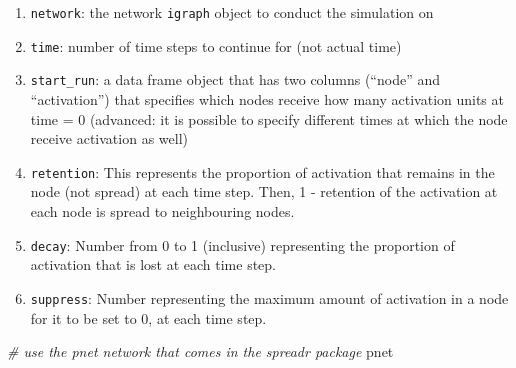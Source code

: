\documentclass[
]{book}
\newenvironment{Shaded}{\begin{snugshade}}{\end{snugshade}}
\newcommand{\CommentTok}[1]{\textcolor[rgb]{0.56,0.35,0.01}{\textit{#1}}}
\newcommand{\NormalTok}[1]{#1}
\providecommand{\tightlist}{%
  \setlength{\itemsep}{0pt}\setlength{\parskip}{0pt}}
\begin{document}
\begin{enumerate}
\def\labelenumi{\arabic{enumi}.}
\tightlist
\item
  \texttt{network}: the network \texttt{igraph} object to conduct the simulation on
\item
  \texttt{time}: number of time steps to continue for (not actual time)
\item
  \texttt{start\_run}: a data frame object that has two columns (``node'' and ``activation'') that specifies which nodes receive how many activation units at time = 0 (advanced: it is possible to specify different times at which the node receive activation as well)
\item
  \texttt{retention}: This represents the proportion of activation that remains in the node (not spread) at each time step. Then, 1 - retention of the activation at each node is spread to neighbouring nodes.
\item
  \texttt{decay}: Number from 0 to 1 (inclusive) representing the proportion of activation that is lost at each time step.
\item
  \texttt{suppress}: Number representing the maximum amount of activation in a node for it to be set to 0, at each time step.
\end{enumerate}

\begin{Shaded}
\begin{Highlighting}[]
\CommentTok{\# use the pnet network that comes in the spreadr package}
\NormalTok{pnet}
\end{Highlighting}
\end{Shaded}
\end{document}
